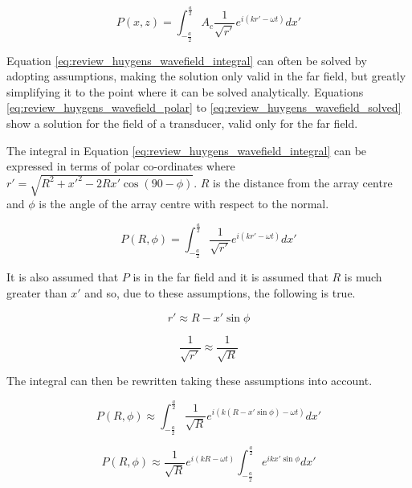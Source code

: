 \begin{equation} \label{eq:review_huygens_wavefield_integral}
P(x,z) = \int_{-\frac{a}{2}}^{\frac{a}{2}} A_c \frac{1}{\sqrt{r'}} e^{i(kr' - \omega t)} dx'
\end{equation}

Equation \ref{eq:review_huygens_wavefield_integral} can often be solved by adopting assumptions, making the solution only valid in the far field, but greatly simplifying it to the point where it can be solved analytically. Equations \ref{eq:review_huygens_wavefield_polar} to \ref{eq:review_huygens_wavefield_solved} show a solution for the field of a transducer, valid only for the far field.

The integral in Equation \ref{eq:review_huygens_wavefield_integral} can be expressed in terms of polar co-ordinates where $r' = \sqrt{R^2 + x'^2 - 2Rx'\cos(90 - \phi)}$. $R$ is the distance from the array centre and $\phi$ is the angle of the array centre with respect to the normal.

\begin{equation} \label{eq:review_huygens_wavefield_polar}
P(R,\phi) = \int_{-\frac{a}{2}}^{\frac{a}{2}} \frac{1}{\sqrt{r'}} e^{i(kr' - \omega t)} dx'
\end{equation}

It is also assumed that $P$ is in the far field and it is assumed that $R$ is much greater than $x'$ and so, due to these assumptions, the following is true.

\begin{equation} \label{eq:review_huygens_assumption1}
r' \approx R - x'\sin\phi
\end{equation}

\begin{equation} \label{eq:review_huygens_assumption2}
\frac{1}{\sqrt{r'}} \approx \frac{1}{\sqrt{R}} 
\end{equation}

The integral can then be rewritten taking these assumptions into account.

\begin{equation} \label{eq:review_huygens_wavefield_phi1}
P(R,\phi) \approx \int_{-\frac{a}{2}}^{\frac{a}{2}} \frac{1}{\sqrt{R}} e^{i(k(R - x'\sin\phi) - \omega t)} dx'
\end{equation}

\begin{equation} \label{eq:review_huygens_wavefield_phi2}
P(R,\phi) \approx \frac{1}{\sqrt{R}} e^{i(kR - \omega t)} \int_{-\frac{a}{2}}^{\frac{a}{2}} e^{i kx' \sin\phi} dx'
\end{equation}

